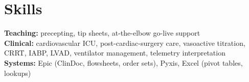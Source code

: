 \documentclass[11pt, letterpaper]{article}
\begin{document}
\section{Skills}

\textbf{Teaching:} precepting, tip sheets, at-the-elbow go-live support \\
\textbf{Clinical:} cardiovascular ICU, post-cardiac-surgery care, vasoactive titration, CRRT, IABP, LVAD, ventilator management, telemetry interpretation \\
\textbf{Systems:} Epic (ClinDoc, flowsheets, order sets), Pyxis, Excel (pivot tables, lookups)


\par{}
\end{document}
